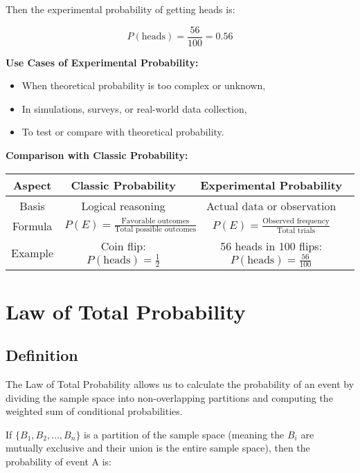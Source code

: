 \documentclass{article}
\begin{document}
Then the experimental probability of getting heads is:

\[
P(\text{heads}) = \frac{56}{100} = 0.56
\]

\bigskip

\noindent
\textbf{Use Cases of Experimental Probability:}
\begin{itemize}
    \item When theoretical probability is too complex or unknown,
    \item In simulations, surveys, or real-world data collection,
    \item To test or compare with theoretical probability.
\end{itemize}

\bigskip

\noindent
\textbf{Comparison with Classic Probability:}

\begin{center}
\begin{tabular}{|c|c|c|}
\hline
\textbf{Aspect} & \textbf{Classic Probability} & \textbf{Experimental Probability} \\
\hline
Basis & Logical reasoning & Actual data or observation \\
\hline
Formula & \( P(E) = \frac{\text{Favorable outcomes}}{\text{Total possible outcomes}} \) & \( P(E) = \frac{\text{Observed frequency}}{\text{Total trials}} \) \\
\hline
Example & Coin flip: \( P(\text{heads}) = \frac{1}{2} \) & 56 heads in 100 flips: \( P(\text{heads}) = \frac{56}{100} \) \\
\hline
\end{tabular}
\end{center}
\section{Law of Total Probability}

\subsection{Definition}
The Law of Total Probability allows us to calculate the probability of an event by dividing the sample space into non-overlapping partitions and computing the weighted sum of conditional probabilities.

If $\{B_1, B_2, \ldots, B_n\}$ is a partition of the sample space (meaning the $B_i$ are mutually exclusive and their union is the entire sample space), then the probability of event A is:
\end{document}
